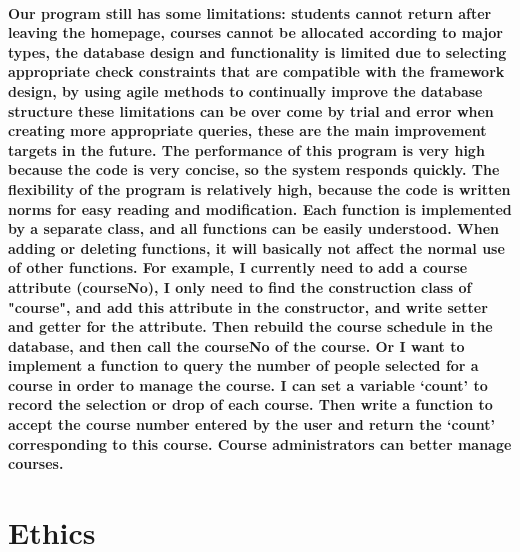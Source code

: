 \documentclass[12pt]{article}
\begin{document}
\paragraph{Our program still has some limitations: students cannot return after leaving the homepage, courses cannot be allocated according to major types, the database design and functionality is limited due to selecting appropriate check constraints that are compatible with the framework design, by using agile methods to continually improve the database structure these limitations can be over come by trial and error when creating more appropriate queries,  these are the main improvement targets in the future. 
\para The performance of this program is very high because the code is very concise, so the system responds quickly. The flexibility of the program is relatively high, because the code is written norms for easy reading and modification. Each function is implemented by a separate class, and all functions can be easily understood. When adding or deleting functions, it will basically not affect the normal use of other functions. For example, I currently need to add a course attribute (courseNo), I only need to find the construction class of "course", and add this attribute in the constructor, and write setter and getter for the attribute. Then rebuild the course schedule in the database, and then call the courseNo of the course. Or I want to implement a function to query the number of people selected for a course in order to manage the course. I can set a variable ‘count’ to record the selection or drop of each course. Then write a function to accept the course number entered by the user and return the ‘count’ corresponding to this course. Course administrators can better manage courses.}

\newpage


\section{Ethics } %
\end{document}
